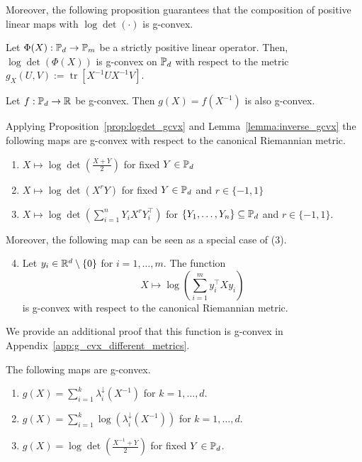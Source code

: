 \documentclass[twoside,11pt]{article}
\begin{document}
%
Moreover, the following proposition guarantees that the composition of positive linear maps with $\log \det(\cdot)$ is g-convex.
%
\begin{prop}\label{prop:logdet_gcvx} Let $\Phi(X):\mathbb{P}_d \to \mathbb{P}_m$ be a strictly positive linear operator. Then, $\log \operatorname{det}(\Phi(X))$ is g-convex on $\mathbb{P}_d$ with respect to the metric $g_X(U, V):=\operatorname{tr}\left[X^{-1} U X^{-1} V\right]$.
\end{prop}
%
\begin{prop}\label{lemma:inverse_gcvx}
    Let $f: \mathbb{P}_d \to \mathbb{R}$ be g-convex.
    Then $g(X) = f(X^{-1})$ is also g-convex.
\end{prop}


\begin{example}
    Applying Proposition~\ref{prop:logdet_gcvx} and Lemma~\ref{lemma:inverse_gcvx} the following maps are g-convex with respect to the canonical Riemannian metric.
    \begin{enumerate}
        \item $X \mapsto \log \det \left(\frac{X+Y}{2}\right)$ for fixed $Y \in \mathbb{P}_d$
        \item $X \mapsto \log \det \left(X^{r}Y \right)$ for fixed $Y \in \mathbb{P}_d$ and $r \in \{-1, 1\}$
        \item $X \mapsto \log \det \left(\sum_{i=1}^n Y_i X^{r} Y_i^\top \right)$ for $\{Y_1, \ldots, Y_n\} \subseteq \mathbb{P}_d$ and $r \in \{-1,1\}$.
    \end{enumerate}
    Moreover, the following map can be seen as a special case of (3). 
    \begin{enumerate}\setcounter{enumi}{3}
        \item Let $y_i \in \mathbb{R}^d \setminus \{0\}$ for $i = 1, \ldots, m$. The function 
        \[
        X \mapsto \log \left(\sum_{i=1}^m y_i^\top X y_i \right)
        \]
        is g-convex with respect to the canonical Riemannian metric.
    \end{enumerate}
    We provide an additional proof that this function is g-convex in Appendix~\ref{app:g_cvx_different_metrics}.
\end{example}
%
\begin{example}
The following maps are g-convex.
    \begin{enumerate}
        \item $g(X) = \sum_{i=1}^k \lambda_i^\downarrow(X^{-1})$ for $k = 1, \ldots, d.$
        \item $g(X) = \sum_{i=1}^k \log\left(\lambda_i^\downarrow(X^{-1})\right)$ for $k = 1, \ldots, d.$
        \item $g(X) = \log \det \left(\frac{X^{-1} + Y}{2}\right)$ for fixed $Y \in \mathbb{P}_d$.
    \end{enumerate}
\end{example}
\end{document}

